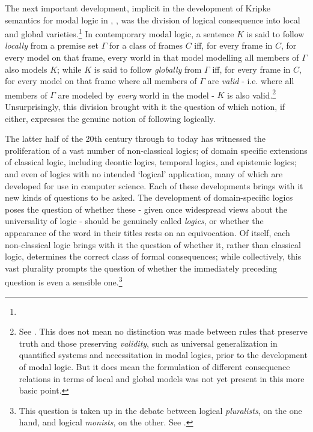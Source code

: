 \documentclass[]{article}
\begin{document}
The next important development, implicit in the development of Kripke semantics for modal logic in \cite{Kripke1963a}, \cite{Kripke1965}, was the division of logical consequence into local and global varieties.\footnote{} In contemporary modal logic, a sentence $K$ is said to follow \textit{locally} from a premise set $\Gamma$  for a class of frames $C$ iff, for every frame in $C$, for every model on that frame, every world in that model modelling all members of $\Gamma$ also models $K$; while $K$ is said to follow \textit{globally} from $\Gamma$ iff, for every frame in $C$, for every model on that frame where all members of $\Gamma$ are \textit{valid} - i.e. where all members of $\Gamma$ are modeled by \textit{every} world in the model - $K$ is also valid.\footnote{See \cite[21-23]{Fitting1998} \cite[31-32]{Blackburn2001}. This does not mean no distinction was made between rules that preserve truth and those preserving \textit{validity}, such as universal generalization in quantified systems and necessitation in modal logics, prior to the development of modal logic. But it does mean the formulation of different consequence relations in terms of local and global models was not yet present in this more basic point.} Unsurprisingly, this division brought with it the question of which notion, if either, expresses the genuine notion of following logically.

The latter half of the 20th century through to today has witnessed the proliferation of a vast number of non-classical logics; of domain specific extensions of classical logic, including deontic logics, temporal logics, and epistemic logics; and even of logics with no intended `logical' application, many of which are developed for use in computer science. Each of these developments brings with it new kinds of questions to be asked. The development of domain-specific logics poses the question of whether these - given once widespread views about the universality of logic - should be genuinely called \textit{logics}, or whether the appearance of the word in their titles rests on an equivocation. Of itself, each non-classical logic brings with it the question of whether it, rather than classical logic, determines the correct class of formal consequences; while collectively, this vast plurality prompts the question of whether the immediately preceding question is even a sensible one.\footnote{This question is taken up in the debate between logical \textit{pluralists}, on the one hand, and logical \textit{monists}, on the other. See \cite{BeallRestall2006} \cite{Griffiths2013}.}
\end{document}
